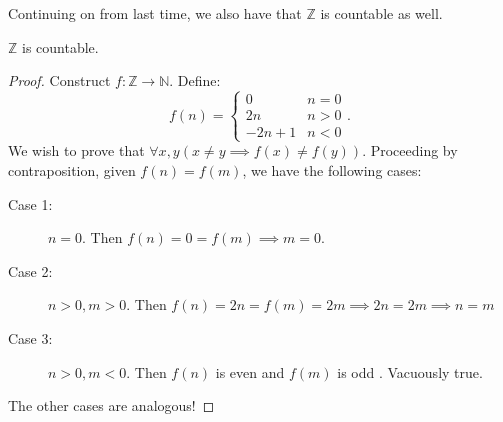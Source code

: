 \documentclass[a4paper]{article}
\begin{document}

Continuing on from last time, we also have that \( \mathbb{Z} \) is countable as well.

\begin{theorem}
	\( \mathbb{Z} \) is countable.
\end{theorem}
\begin{proof}
	Construct \( f \colon \mathbb{Z} \to  \mathbb{N} \). Define:
	\[
		f(n) = \begin{cases}
			0 & n = 0 \\
			2n & n > 0 \\
			-2n + 1 & n < 0
		\end{cases}
	.\] We wish to prove that \( \forall x,y (x \neq  y \implies f(x) \neq  f(y)) \). Proceeding by contraposition, given \( f(n)=f(m) \), we have the following cases:
	\begin{description}
		\item[Case 1:] \( n = 0 \). Then \( f(n) = 0 = f(m) \implies m = 0\).
		\item[Case 2:] \( n > 0, m > 0 \). Then \( f(n) = 2n = f(m) = 2m \implies 2n = 2m \implies n = m \)
		\item[Case 3:] \( n > 0, m < 0 \). Then \( f(n) \) is even and \( f(m) \) is odd \contra. Vacuously true.
	\end{description}
	The other cases are analogous!
\end{proof}
\end{document}
